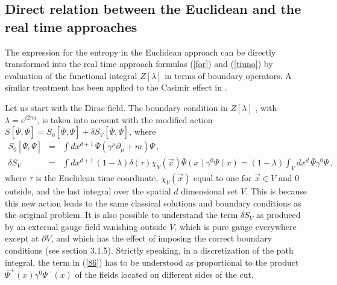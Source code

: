 \documentclass[a4paper]{article}
\begin{document}
\subsection{Direct relation between the Euclidean and the real time approaches}
The expression for the entropy in the Euclidean approach can be directly transformed into the real time approach formulas (\ref{for}) and (\ref{tiuno}) by evaluation of the functional integral $ Z[\lambda]$ in terms of boundary operators. A similar treatment has been applied to the Casimir effect in \cite{fos}. 


Let us start with the Dirac field. The boundary condition in $Z[\lambda]$ , with $\lambda=e^{i 2 \pi a}$, is taken into account with the modified action $S[\bar{\Psi},\Psi]=S_0[\bar{\Psi},\Psi]+\delta S_V[\bar{\Psi},\Psi]$, where 
\begin{eqnarray}
S_0[\bar{\Psi},\Psi]&=&\int dx^{d+1}\,\bar{\Psi} (\gamma^\mu \partial_\mu + m) \Psi \,,\\
\delta S_V&=& \int dx^{d+1}\, (1-\lambda) \delta(\tau)\chi_V(\vec{x}) \bar{\Psi}(x) \gamma^0\Psi(x)= (1-\lambda) \int_V dx^d\, \bar{\Psi}\gamma^0 \Psi \,,
\label{86}
\end{eqnarray}
where $\tau$ is the Euclidean time coordinate,  $\chi_V(\vec{x})$ equal to one for $\vec{x}\in V$ and $0$ outside, and the last integral over the spatial $d$ dimensional set $V$.  This is because this new action leads to the same classical solutions and boundary conditions as the original problem. It is also possible to understand the term $\delta S_V$ as produced by an external gauge field vanishing outside  $V$, which is pure gauge everywhere except at $\partial V$, and which has the effect of imposing the correct boundary conditions (see section 3.1.5).
Strictly speaking, in a discretization of the path integral, the term in (\ref{86}) has to be understood as proportional to the product $\bar{\Psi}^+(x) \gamma^0\Psi^-(x)$ of the fields located on different sides of the cut. 
\end{document}

